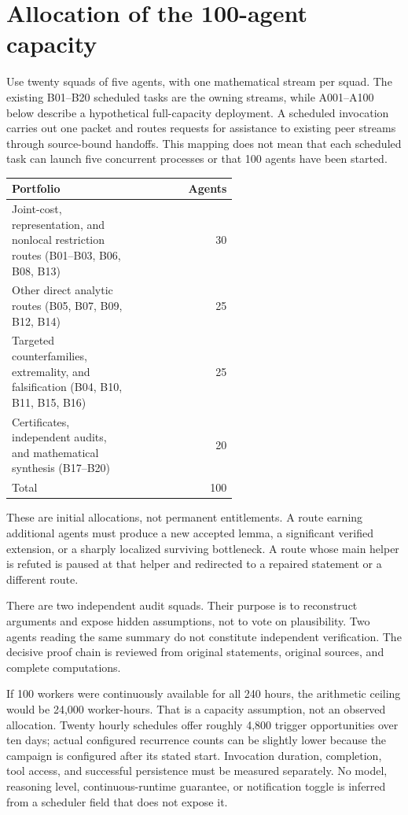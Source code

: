 \documentclass[11pt]{article}
\begin{document}
\section{Allocation of the 100-agent capacity}

Use twenty squads of five agents, with one mathematical stream per squad. The existing B01--B20 scheduled tasks are the owning streams, while A001--A100 below describe a hypothetical full-capacity deployment. A scheduled invocation carries out one packet and routes requests for assistance to existing peer streams through source-bound handoffs. This mapping does not mean that each scheduled task can launch five concurrent processes or that 100 agents have been started.

\begin{center}
\begin{tabular}{p{0.57\linewidth}r}
\toprule
Portfolio & Agents \\
\midrule
Joint-cost, representation, and nonlocal restriction routes (B01--B03, B06, B08, B13) & 30 \\
Other direct analytic routes (B05, B07, B09, B12, B14) & 25 \\
Targeted counterfamilies, extremality, and falsification (B04, B10, B11, B15, B16) & 25 \\
Certificates, independent audits, and mathematical synthesis (B17--B20) & 20 \\
\midrule
Total & 100 \\
\bottomrule
\end{tabular}
\end{center}

These are initial allocations, not permanent entitlements. A route earning additional agents must produce a new accepted lemma, a significant verified extension, or a sharply localized surviving bottleneck. A route whose main helper is refuted is paused at that helper and redirected to a repaired statement or a different route.

There are two independent audit squads. Their purpose is to reconstruct arguments and expose hidden assumptions, not to vote on plausibility. Two agents reading the same summary do not constitute independent verification. The decisive proof chain is reviewed from original statements, original sources, and complete computations.

If 100 workers were continuously available for all 240 hours, the arithmetic ceiling would be 24,000 worker-hours. That is a capacity assumption, not an observed allocation. Twenty hourly schedules offer roughly 4,800 trigger opportunities over ten days; actual configured recurrence counts can be slightly lower because the campaign is configured after its stated start. Invocation duration, completion, tool access, and successful persistence must be measured separately. No model, reasoning level, continuous-runtime guarantee, or notification toggle is inferred from a scheduler field that does not expose it.
\end{document}

